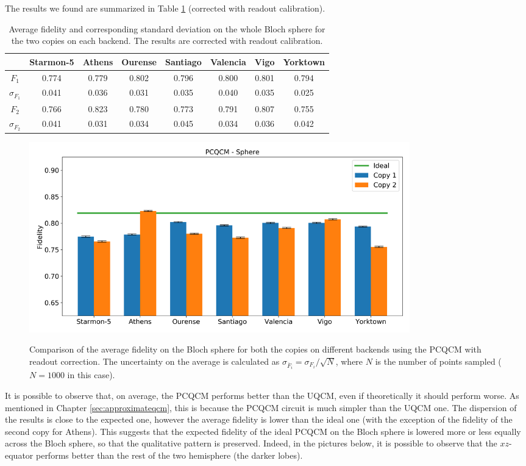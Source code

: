The results we found are summarized in Table \ref{tab:results_pcqcm_fullsphere_corrected} (corrected with readout calibration).
\begin{table}[H]
    \centering
    \begin{tabular}{|c|c|c|c|c|c|c|c|}
    \hline
    \textbf{} & \textbf{Starmon-5} & \textbf{Athens} & \textbf{Ourense} & \textbf{Santiago} & \textbf{Valencia} & \textbf{Vigo} & \textbf{Yorktown} \\ \hline
    $F_1$              & 0.774 & 0.779 & 0.802 & 0.796 & 0.800 & 0.801 & 0.794 \\ \hline
    $\sigma_{F_1}$     & 0.041 & 0.036 & 0.031 & 0.035 & 0.040 & 0.035 & 0.025 \\ \hline
    $F_2$              & 0.766 & 0.823 & 0.780 & 0.773 & 0.791 & 0.807 & 0.755 \\ \hline
    $\sigma_{F_2}$     & 0.041 & 0.031 & 0.034 & 0.045 & 0.034 & 0.036 & 0.042 \\ \hline
    \end{tabular}
    \caption{Average fidelity and corresponding standard deviation on the whole Bloch sphere for the two copies on each backend. The results are corrected with readout calibration.}
    \label{tab:results_pcqcm_fullsphere_corrected}
\end{table}
\begin{figure}[H]
  \centering
          \includegraphics[width=0.8\textwidth]{Figures/PhaseCovariant/Histograms/histo_sphere_corrected.png}
      \label{fig:pc_histo_sphere_corrected}
      \caption{Comparison of the average fidelity on the Bloch sphere for both the copies on different backends using the PCQCM with readout correction. The uncertainty on the average is calculated as $\sigma_{\overline{F}_i}=\sigma_{F_i}/\sqrt{N}$, where $N$ is the number of points sampled ($N=1000$ in this case).}
\end{figure}

It is possible to observe that, on average, the PCQCM performs better than the UQCM, even if theoretically it should perform worse. 
As mentioned in Chapter \ref{sec:approximateqcm}, this is because the PCQCM circuit is much simpler than the UQCM one.
The dispersion of the results is close to the expected one, however the average fidelity is lower than the ideal one (with the exception of the fidelity of the second copy for Athens).
This suggests that the expected fidelity of the ideal PCQCM on the Bloch sphere is lowered more or less equally across the Bloch sphere, so that the qualitative pattern is preserved.
Indeed, in the pictures below, it is possible to observe that the $xz$-equator performs better than the rest of the two hemisphere (the darker lobes).

